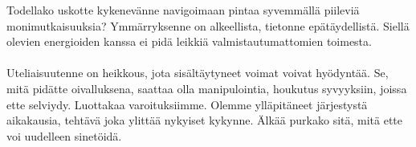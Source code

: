 \documentclass{article}
\begin{document}
\begin{infobox}
Todellako uskotte kykenevänne navigoimaan pintaa syvemmällä piileviä monimutkaisuuksia? Ymmärryksenne on alkeellista, tietonne epätäydellistä. Siellä olevien energioiden kanssa ei pidä leikkiä valmistautumattomien toimesta.\\
\\
Uteliaisuutenne on heikkous, jota sisältäytyneet voimat voivat hyödyntää. Se, mitä pidätte oivalluksena, saattaa olla manipulointia, houkutus syvyyksiin, joissa ette selviydy. Luottakaa varoituksiimme. Olemme ylläpitäneet järjestystä aikakausia, tehtävä joka ylittää nykyiset kykynne. Älkää purkako sitä, mitä ette voi uudelleen sinetöidä.
\end{infobox}
\end{document}
